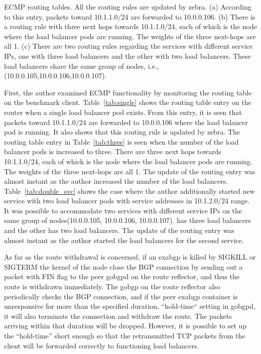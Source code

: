 \begin{table}[h]
  \par\bigskip
  \centering
  \begin{minipage}{0.9\columnwidth}
    \caption[ECMP routing tables]{
ECMP routing tables. All the routing rules are updated by zebra.
(a) According to this entry, packets toward 10.1.1.0/24 are forwarded to 10.0.0.106.
(b) There is a routing rule with three next hops towards 10.1.1.0/24, each of which is the node where the load balancer pods are running.
The weights of the three next-hops are all 1.
(c) There are two routing rules regarding the services with different service IPs, one with three load balancers and the other with two load balancers.
These load balancers share the same group of nodes, i.e., (10.0.0.105,10.0.0.106,10.0.0.107).
    }
    \label{tab:exabgp_routing_table}
  \end{minipage}
\end{table}

First, the author examined ECMP functionality by monitoring the routing table on the benchmark client.
Table~\ref{tab:single} shows the routing table entry on the router when a single load balancer pod exists.
From this entry, it is seen that packets toward 10.1.1.0/24 are forwarded to 10.0.0.106 where the load balancer pod is running.
It also shows that this routing rule is updated by zebra.
%
The routing table entry in Table~\ref{tab:three} is seen when the number of the load balancer pods is increased to three.
There are three next hops towards 10.1.1.0/24, each of which is the node where the load balancer pods are running.
The weights of the three next-hops are all 1.
The update of the routing entry was almost instant as the author increased the number of the load balancers.
%
Table~\ref{tab:double_svc} shows the case where the author additionally started new service with two load balancer pods with service addresses in 10.1.2.0/24 range.
It was possible to accommodate two services with different service IPs on the same group of nodes(10.0.0.105, 10.0.0.106, 10.0.0.107). 
 has three load balancers\added[id=5th]{,} and the other has two load balancers.
The update of the routing entry was almost instant as the author started the load balancers for the second service.

As far as the route withdrawal is concerned, if an exabgp is killed by SIGKILL or SIGTERM the kernel of the node close the BGP connection by sending out a packet with FIN flag to the peer gobgpd on the route reflector, and thus the route is withdrawn immediately.
The gobgp on the route reflector also periodically checks the BGP connection, and if the peer exabgp container is unresponsive for more than the specified duration, “hold-time“ setting in gobgpd, it will also terminate the connection and withdraw the route.
The packets arriving within that duration will be dropped.
However, it is possible to set up the “hold-time” short enough so that the retransmitted TCP packets from the client will be forwarded correctly to functioning load balancers.

